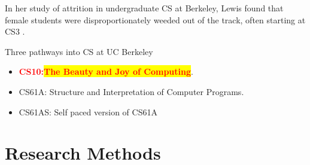 \documentclass{beamer}                  %
\newcommand{\hilight}[1]{\colorbox{yellow}{#1}}
\begin{document}
        \begin{frame}{}
        In her study of attrition in undergraduate CS at Berkeley, Lewis found that female students were disproportionately weeded out of the track, often starting at CS3 \cite{Lewis:EECS-2010-132}.
        \end{frame}

        \begin{frame}{}
        Three pathways into CS at UC Berkeley
            \begin{itemize}
                 \item \textcolor{red}{\textbf{CS10:\hilight{The Beauty and Joy of Computing}}}.
                 \item CS61A: Structure and Interpretation of Computer Programs.
                \item CS61AS: Self paced version of CS61A
            \end{itemize}
        \end{frame}


\section{Research Methods}
\begin{frame}{}

  \begin{figure}[!htbp]
      \centering
        
  \end{figure}

\end{frame}
\end{document}
